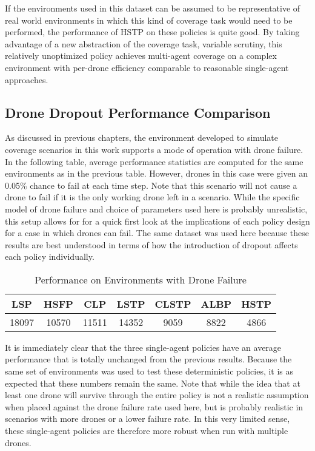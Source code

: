 If the environments used in this dataset can be assumed to be representative of real world environments in which this kind of coverage task would need to be performed, the performance of HSTP on these policies is quite good. By taking advantage of a new abstraction of the coverage task, variable scrutiny, this relatively unoptimized policy achieves multi-agent coverage on a complex environment with per-drone efficiency comparable to reasonable single-agent approaches.

\subsection{Drone Dropout Performance Comparison}

As discussed in previous chapters, the environment developed to simulate coverage scenarios in this work supports a mode of operation with drone failure. In the following table, average performance statistics are computed for the same environments as in the previous table. However, drones in this case were given an 0.05\% chance to fail at each time step. Note that this scenario will not cause a drone to fail if it is the only working drone left in a scenario. While the specific model of drone failure and choice of parameters used here is probably unrealistic, this setup allows for for a quick first look at the implications of each policy design for a case in which drones can fail. The same dataset was used here because these results are best understood in terms of how the introduction of dropout affects each policy individually.

\begin{table}[h]
\begin{center}
 \begin{tabular}{||c c c c c c c ||}
 \hline
 LSP   & HSFP  & CLP   & LSTP  & CLSTP & ALBP & HSTP \\
 \hline
 18097 & 10570 & 11511 & 14352 & 9059  & 8822 & 4866 \\
 \hline
 \end{tabular}
\end{center}
\caption{Performance on Environments with Drone Failure}
\end{table}

It is immediately clear that the three single-agent policies have an average performance that is totally unchanged from the previous results. Because the same set of environments was used to test these deterministic policies, it is as expected that these numbers remain the same. Note that while the idea that at least one drone will survive through the entire policy is not a realistic assumption when placed against the drone failure rate used here, but is probably realistic in scenarios with more drones or a lower failure rate. In this very limited sense, these single-agent policies are therefore more robust when run with multiple drones.

